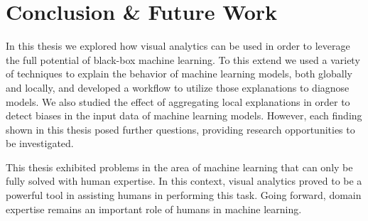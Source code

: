 \chapter{Conclusion \& Future Work}
\label{chap:future_work}

In this thesis we explored how visual analytics can be used in order to leverage the full potential of black-box machine learning.
To this extend we used a variety of techniques to explain the behavior of machine learning models, both globally and locally, and developed a workflow to utilize those explanations to diagnose models.
We also studied the effect of aggregating local explanations in order to detect biases in the input data of machine learning models.
However, each finding shown in this thesis posed further questions, providing research opportunities to be investigated.

This thesis exhibited problems in the area of machine learning that can only be fully solved with human expertise.
In this context, visual analytics proved to be a powerful tool in assisting humans in performing this task.
Going forward, domain expertise remains an important role of humans in machine learning.
